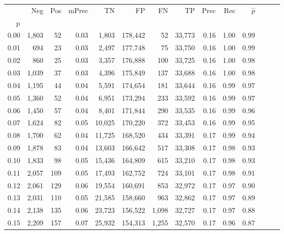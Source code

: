 \begin{tabular}{rrrrrrrrrrrrrr}
\toprule
{} &    Neg &  Pos & mPrec &       TN &       FP &      FN &      TP &  Prec &   Rec & $\hat{p}$ \\
p    &        &      &       &          &          &         &         &       &       &           \\
\midrule
0.00 &  1,803 &   52 &  0.03 &    1,803 &  178,442 &      52 &  33,773 &  0.16 &  1.00 &      0.99 \\
0.01 &    694 &   23 &  0.03 &    2,497 &  177,748 &      75 &  33,750 &  0.16 &  1.00 &      0.99 \\
0.02 &    860 &   25 &  0.03 &    3,357 &  176,888 &     100 &  33,725 &  0.16 &  1.00 &      0.98 \\
0.03 &  1,039 &   37 &  0.03 &    4,396 &  175,849 &     137 &  33,688 &  0.16 &  1.00 &      0.98 \\
0.04 &  1,195 &   44 &  0.04 &    5,591 &  174,654 &     181 &  33,644 &  0.16 &  0.99 &      0.97 \\
0.05 &  1,360 &   52 &  0.04 &    6,951 &  173,294 &     233 &  33,592 &  0.16 &  0.99 &      0.97 \\
0.06 &  1,450 &   57 &  0.04 &    8,401 &  171,844 &     290 &  33,535 &  0.16 &  0.99 &      0.96 \\
0.07 &  1,624 &   82 &  0.05 &   10,025 &  170,220 &     372 &  33,453 &  0.16 &  0.99 &      0.95 \\
0.08 &  1,700 &   62 &  0.04 &   11,725 &  168,520 &     434 &  33,391 &  0.17 &  0.99 &      0.94 \\
0.09 &  1,878 &   83 &  0.04 &   13,603 &  166,642 &     517 &  33,308 &  0.17 &  0.98 &      0.93 \\
0.10 &  1,833 &   98 &  0.05 &   15,436 &  164,809 &     615 &  33,210 &  0.17 &  0.98 &      0.93 \\
0.11 &  2,057 &  109 &  0.05 &   17,493 &  162,752 &     724 &  33,101 &  0.17 &  0.98 &      0.91 \\
0.12 &  2,061 &  129 &  0.06 &   19,554 &  160,691 &     853 &  32,972 &  0.17 &  0.97 &      0.90 \\
0.13 &  2,031 &  110 &  0.05 &   21,585 &  158,660 &     963 &  32,862 &  0.17 &  0.97 &      0.89 \\
0.14 &  2,138 &  135 &  0.06 &   23,723 &  156,522 &   1,098 &  32,727 &  0.17 &  0.97 &      0.88 \\
0.15 &  2,209 &  157 &  0.07 &   25,932 &  154,313 &   1,255 &  32,570 &  0.17 &  0.96 &      0.87 \\

\end{tabular}
